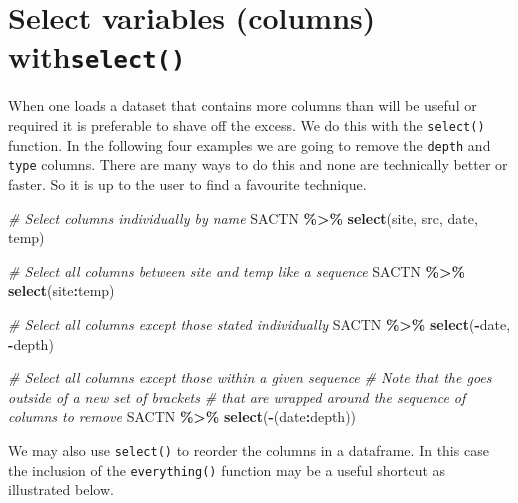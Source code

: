\documentclass[
]{book}
\newenvironment{Shaded}{\begin{snugshade}}{\end{snugshade}}
\newcommand{\CommentTok}[1]{\textcolor[rgb]{0.56,0.35,0.01}{\textit{#1}}}
\newcommand{\KeywordTok}[1]{\textcolor[rgb]{0.13,0.29,0.53}{\textbf{#1}}}
\newcommand{\NormalTok}[1]{#1}
\newcommand{\OperatorTok}[1]{\textcolor[rgb]{0.81,0.36,0.00}{\textbf{#1}}}
\newcommand{\StringTok}[1]{\textcolor[rgb]{0.31,0.60,0.02}{#1}}
\begin{document}
\hypertarget{select-variables-columns-withselect}{%
\section{\texorpdfstring{Select variables (columns) with\texttt{select()}}{Select variables (columns) withselect()}}\label{select-variables-columns-withselect}}

When one loads a dataset that contains more columns than will be useful or required it is preferable to shave off the excess. We do this with the \texttt{select()} function. In the following four examples we are going to remove the \texttt{depth} and \texttt{type} columns. There are many ways to do this and none are technically better or faster. So it is up to the user to find a favourite technique.

\begin{Shaded}
\begin{Highlighting}[]
\CommentTok{\# Select columns individually by name}
\NormalTok{SACTN }\OperatorTok{\%>\%}\StringTok{ }
\StringTok{  }\KeywordTok{select}\NormalTok{(site, src, date, temp)}

\CommentTok{\# Select all columns between site and temp like a sequence}
\NormalTok{SACTN }\OperatorTok{\%>\%}\StringTok{ }
\StringTok{  }\KeywordTok{select}\NormalTok{(site}\OperatorTok{:}\NormalTok{temp)}

\CommentTok{\# Select all columns except those stated individually}
\NormalTok{SACTN }\OperatorTok{\%>\%}\StringTok{ }
\StringTok{  }\KeywordTok{select}\NormalTok{(}\OperatorTok{{-}}\NormalTok{date, }\OperatorTok{{-}}\NormalTok{depth)}

\CommentTok{\# Select all columns except those within a given sequence}
  \CommentTok{\# Note that the \textquotesingle{}{-}\textquotesingle{} goes outside of a new set of brackets}
  \CommentTok{\# that are wrapped around the sequence of columns to remove}
\NormalTok{SACTN }\OperatorTok{\%>\%}\StringTok{ }
\StringTok{  }\KeywordTok{select}\NormalTok{(}\OperatorTok{{-}}\NormalTok{(date}\OperatorTok{:}\NormalTok{depth))}
\end{Highlighting}
\end{Shaded}

We may also use \texttt{select()} to reorder the columns in a dataframe. In this case the inclusion of the \texttt{everything()} function may be a useful shortcut as illustrated below.
\end{document}

